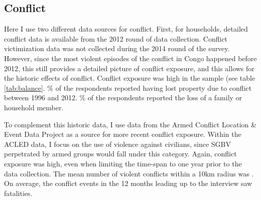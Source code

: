 \documentclass[10pt,a4paper]{scrartcl} %
\begin{document}
\subsection*{Conflict}
Here I use two different data sources for conflict. First, for  households, detailed conflict data is available from the 2012 round of data collection. Conflict victimization data was not collected during the 2014 round of the survey. However, since the most violent episodes of the conflict in Congo happened before 2012, this still provides a detailed picture of conflict exposure, and this allows for the historic effects of conflict. Conflict exposure was high in the sample (see table \ref{tab:balance}. \% of the respondents reported having lost property due to conflict between 1996 and 2012.  \% of the respondents reported the loss of a family or household member.

To complement this historic data, I use data from the Armed Conflict Location \& Event Data Project \citep[ACLED;][]{Raleigh2010} as a source for more recent conflict exposure. Within the ACLED data, I focus on the use of violence against civilians, since SGBV perpetrated by armed groups would fall under this category. Again, conflict exposure was high, even when limiting the time-span to one year prior to the data collection. The mean number of violent conflicts within a 10km radius was . On average, the conflict events in the 12 months leading up to the interview saw  fatalities.
\end{document}
